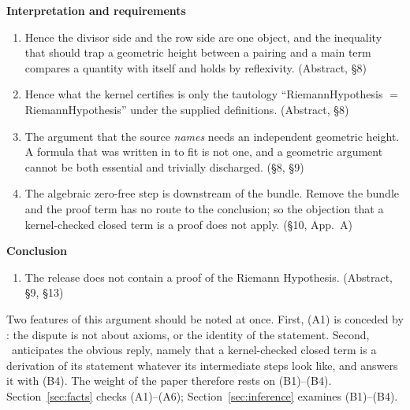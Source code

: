 \begin{notebox}
\textbf{Interpretation and requirements}
\begin{enumerate}[label=(B\arabic*),leftmargin=3.2em]
\item Hence the divisor side and the row side are one object, and the inequality that should trap a geometric height between a pairing and a main term compares a quantity with itself and holds by reflexivity. \hfill (Abstract, \S8)
\item Hence what the kernel certifies is only the tautology ``RiemannHypothesis $=$ RiemannHypothesis'' under the supplied definitions. \hfill (Abstract, \S8)
\item The argument that the source \emph{names} needs an independent geometric height. A formula that was written in to fit is not one, and a geometric argument cannot be both essential and trivially discharged. \hfill (\S8, \S9)
\item The algebraic zero-free step is downstream of the bundle. Remove the bundle and the proof term has no route to the conclusion; so the objection that a kernel-checked closed term is a proof does not apply. \hfill (\S10, App.~A)
\end{enumerate}
\textbf{Conclusion}
\begin{enumerate}[label=(C),leftmargin=3.2em]
\item The release does not contain a proof of the Riemann Hypothesis. \hfill (Abstract, \S9, \S13)
\end{enumerate}
\end{notebox}

Two features of this argument should be noted at once.
First, (A1) is conceded by \N: the dispute is not about axioms,  or the identity of the statement.
Second, \N\ anticipates the obvious reply, namely that a kernel-checked closed term is a derivation of its statement whatever its intermediate steps look like, and answers it with (B4).
The weight of the paper therefore rests on (B1)--(B4). Section~\ref{sec:facts} checks (A1)--(A6); Section~\ref{sec:inference} examines (B1)--(B4).
